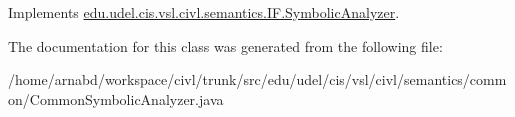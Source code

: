 Implements \hyperlink{interfaceedu_1_1udel_1_1cis_1_1vsl_1_1civl_1_1semantics_1_1IF_1_1SymbolicAnalyzer_a668611f8eddcd2a8f302011cdf6fed6e}{edu.\+udel.\+cis.\+vsl.\+civl.\+semantics.\+I\+F.\+Symbolic\+Analyzer}.



The documentation for this class was generated from the following file\+:\begin{DoxyCompactItemize}
\item 
/home/arnabd/workspace/civl/trunk/src/edu/udel/cis/vsl/civl/semantics/common/Common\+Symbolic\+Analyzer.\+java\end{DoxyCompactItemize}
